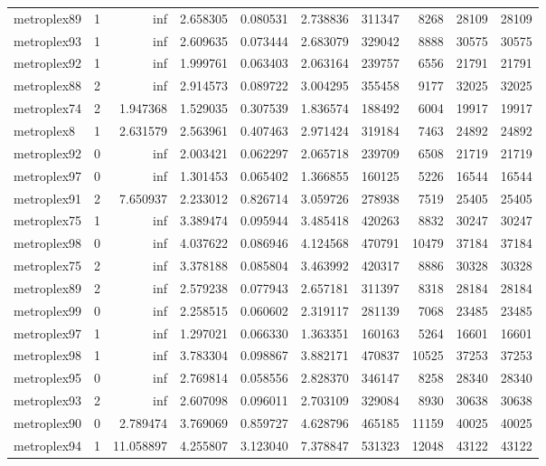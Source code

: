 \begin{longtable}{|l|r|r|r|r|r|r|r|r|r|}
metroplex89 & 1 & inf & 2.658305 & 0.080531 & 2.738836 & 311347 & 8268 & 28109 & 28109 \\
metroplex93 & 1 & inf & 2.609635 & 0.073444 & 2.683079 & 329042 & 8888 & 30575 & 30575 \\
metroplex92 & 1 & inf & 1.999761 & 0.063403 & 2.063164 & 239757 & 6556 & 21791 & 21791 \\
metroplex88 & 2 & inf & 2.914573 & 0.089722 & 3.004295 & 355458 & 9177 & 32025 & 32025 \\
metroplex74 & 2 & 1.947368 & 1.529035 & 0.307539 & 1.836574 & 188492 & 6004 & 19917 & 19917 \\
metroplex8 & 1 & 2.631579 & 2.563961 & 0.407463 & 2.971424 & 319184 & 7463 & 24892 & 24892 \\
metroplex92 & 0 & inf & 2.003421 & 0.062297 & 2.065718 & 239709 & 6508 & 21719 & 21719 \\
metroplex97 & 0 & inf & 1.301453 & 0.065402 & 1.366855 & 160125 & 5226 & 16544 & 16544 \\
metroplex91 & 2 & 7.650937 & 2.233012 & 0.826714 & 3.059726 & 278938 & 7519 & 25405 & 25405 \\
metroplex75 & 1 & inf & 3.389474 & 0.095944 & 3.485418 & 420263 & 8832 & 30247 & 30247 \\
metroplex98 & 0 & inf & 4.037622 & 0.086946 & 4.124568 & 470791 & 10479 & 37184 & 37184 \\
metroplex75 & 2 & inf & 3.378188 & 0.085804 & 3.463992 & 420317 & 8886 & 30328 & 30328 \\
metroplex89 & 2 & inf & 2.579238 & 0.077943 & 2.657181 & 311397 & 8318 & 28184 & 28184 \\
metroplex99 & 0 & inf & 2.258515 & 0.060602 & 2.319117 & 281139 & 7068 & 23485 & 23485 \\
metroplex97 & 1 & inf & 1.297021 & 0.066330 & 1.363351 & 160163 & 5264 & 16601 & 16601 \\
metroplex98 & 1 & inf & 3.783304 & 0.098867 & 3.882171 & 470837 & 10525 & 37253 & 37253 \\
metroplex95 & 0 & inf & 2.769814 & 0.058556 & 2.828370 & 346147 & 8258 & 28340 & 28340 \\
metroplex93 & 2 & inf & 2.607098 & 0.096011 & 2.703109 & 329084 & 8930 & 30638 & 30638 \\
metroplex90 & 0 & 2.789474 & 3.769069 & 0.859727 & 4.628796 & 465185 & 11159 & 40025 & 40025 \\
metroplex94 & 1 & 11.058897 & 4.255807 & 3.123040 & 7.378847 & 531323 & 12048 & 43122 & 43122 \\

\end{longtable}

